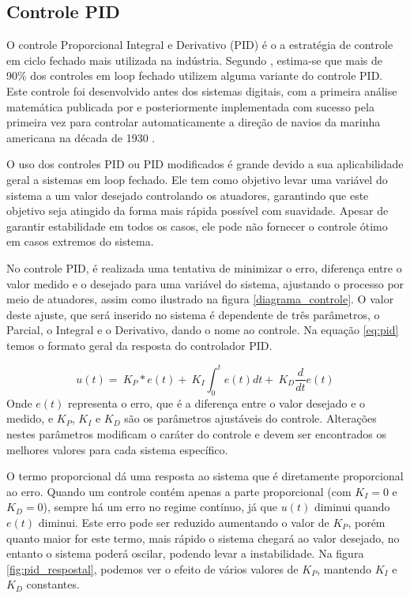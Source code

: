 \subsection{Controle PID}

O controle Proporcional Integral e Derivativo (PID) é o a estratégia de controle em ciclo fechado mais utilizada na indústria. Segundo \citet{pid}, estima-se que mais de 90\% dos controles em loop fechado utilizem alguma variante do controle PID. Este controle foi desenvolvido antes dos sistemas digitais, com a primeira análise matemática publicada por \citet{pid-Minorsky} e posteriormente implementada com sucesso pela primeira vez para controlar automaticamente a direção de navios da marinha americana na década de 1930 \citep{cite-history-of-control}. 

O uso dos controles PID ou PID modificados é grande devido a sua aplicabilidade geral a sistemas em loop fechado. Ele tem como objetivo levar uma variável do sistema a um valor desejado controlando os atuadores, garantindo que este objetivo seja atingido da forma mais rápida possível com suavidade. Apesar de garantir estabilidade em todos os casos, ele pode não fornecer o controle ótimo em casos extremos do sistema.

No controle PID, é realizada uma tentativa de minimizar o erro, diferença entre o valor medido e o desejado para uma variável do sistema, ajustando o processo por meio de atuadores, assim como ilustrado na figura \ref{diagrama_controle}. O valor deste ajuste, que será inserido no sistema é dependente de três parâmetros, o Parcial, o Integral e o Derivativo, dando o nome ao controle. Na equação \ref{eq:pid} temos o formato geral da resposta do controlador PID.

\begin{equation}\label{eq:pid}
u\left(t\right)=\ K_P * e\left(t\right)+\ K_I\int^t_0{e\left(t\right)dt}+\ K_D\frac{d}{dt}e\left(t\right) 
\end{equation}
Onde $e(t)$ representa o erro, que é a diferença entre o valor desejado e o medido, e $K_P$, $K_I$ e $K_D$ são os parâmetros ajustáveis do controle. Alterações nestes parâmetros modificam o caráter do controle e devem ser encontrados os melhores valores para cada sistema específico.

O termo proporcional dá uma resposta ao sistema que é diretamente proporcional ao erro. Quando um controle contém apenas a parte proporcional (com $K_I=0$ e $K_D=0$), sempre há um erro no regime contínuo, já que  $u(t)$ diminui quando $e(t)$ diminui. Este erro pode ser reduzido aumentando o valor de $K_P$, porém quanto maior for este termo, mais rápido o sistema chegará ao valor desejado, no entanto o sistema poderá oscilar, podendo levar a instabilidade. Na figura \ref{fig:pid_respostal}, podemos ver o efeito de vários valores de $K_P$, mantendo $K_I$ e $K_D$ constantes.

